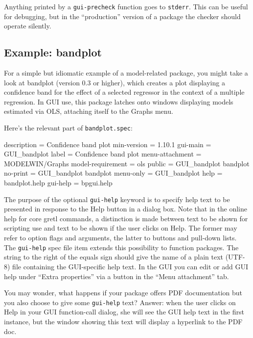 \documentclass[oneside]{book}
\begin{document}
Anything printed by a \texttt{gui-precheck} function goes to
\texttt{stderr}. This can be useful for debugging, but in the
``production'' version of a package the checker should operate
silently.

\subsection{Example: bandplot}
\label{sec:bandplot}

For a simple but idiomatic example of a model-related package, you
might take a look at \textsf{bandplot} (version 0.3 or higher), which
creates a plot displaying a confidence band for the effect of a
selected regressor in the context of a multiple regression.  In GUI
use, this package latches onto windows displaying models estimated via
OLS, attaching itself to the \textsf{Graphs} menu.

Here's the relevant part of \texttt{bandplot.spec}:

\begin{code}
description = Confidence band plot
min-version = 1.10.1
gui-main = GUI_bandplot
label = Confidence band plot
menu-attachment = MODELWIN/Graphs
model-requirement = ols
public = GUI_bandplot bandplot
no-print = GUI_bandplot bandplot
menu-only = GUI_bandplot
help = bandplot.help
gui-help = bpgui.help
\end{code}

The purpose of the optional \texttt{gui-help} keyword is to specify
help text to be presented in response to the \textsf{Help} button in a
dialog box. Note that in the online help for core gretl commands, a
distinction is made between text to be shown for scripting use and
text to be shown if the user clicks on \textsf{Help}. The former may
refer to option flags and arguments, the latter to buttons and
pull-down lists. The \texttt{gui-help} spec file item extends this
possibility to function packages. The string to the right of the
equals sign should give the name of a plain text (UTF-8) file
containing the GUI-specific help text. In the GUI you can edit or add
GUI help under ``Extra properties'' via a button in the ``Menu
attachment'' tab.

You may wonder, what happens if your package offers PDF documentation
but you also choose to give some \texttt{gui-help} text? Answer: when
the user clicks on \textsf{Help} in your GUI function-call dialog, she
will see the GUI help text in the first instance, but the window
showing this text will display a hyperlink to the PDF doc.
\end{document}
